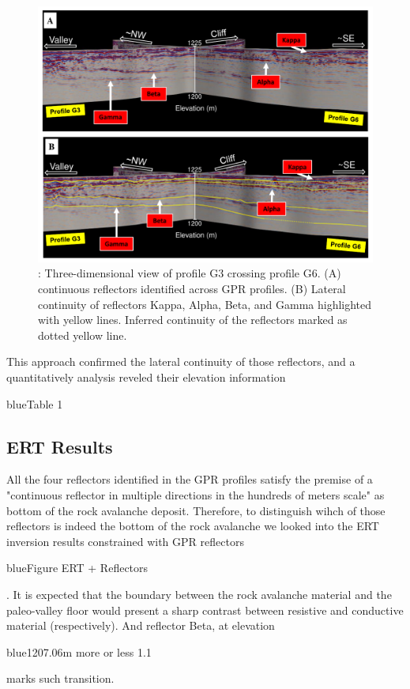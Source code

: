 \documentclass[5p]{elsarticle}
\newcommand{\COMON}{\begin{color}{blue}}
\newcommand{\COMOFF}{\end{color}}
\begin{document}
								   \begin{figure}[h]

	\includegraphics[width=\textwidth]{Figures/Profiles_G3_G6.pdf}
		\caption{: Three-dimensional view of profile G3 crossing profile G6. (A) continuous reflectors identified across GPR profiles. (B) Lateral continuity of reflectors Kappa, Alpha, Beta, and Gamma highlighted with yellow lines. Inferred continuity of the reflectors marked as dotted yellow line.  \label{Profiles_G3_G6}}

								   \end{figure}
	
This approach confirmed the lateral continuity of those reflectors, and  a quantitatively analysis reveled their elevation information\COMON Table 1 \COMOFF
	

    \subsection {ERT Results}

All the four reflectors identified in the GPR profiles satisfy the premise of a "continuous reflector in multiple directions in the hundreds of meters scale" as bottom of the rock avalanche deposit. Therefore, to distinguish wihch of those reflectors is indeed the bottom of the rock avalanche we looked into the ERT inversion results constrained with GPR reflectors \COMON Figure ERT + Reflectors \COMOFF. It is expected that the boundary between the rock avalanche material and the paleo-valley floor would present a sharp contrast between resistive and conductive material (respectively). And reflector Beta, at elevation \COMON 1207.06m more or less 1.1  \COMOFF marks such transition. 
\end{document}
